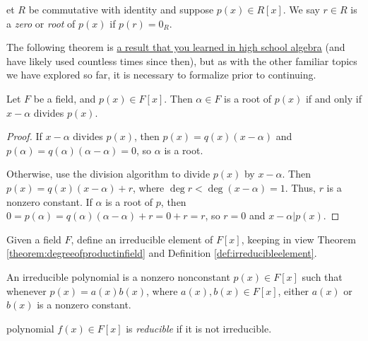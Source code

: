 \documentclass[english,course]{lecture}
\newenvironment{solution}[1][Solution]{\begin{trivlist}\pushQED{\qed}\item[\hskip \labelsep  \bfseries #1{}.\hspace{10pt}]}{\popQED\end{trivlist}}\renewcommand{\qedsymbol}{$\checkmark$}{\newenvironment{answer}{\renewcommand\qedsymbol{$\blacklozenge$}\begin{proof}[Answer]}{\end{proof}}}\newenvironment{answer}[1][Answer]{\begin{trivlist}\pushQED{\qed}\item[\hskip \labelsep  \bfseries #1{}.\hspace{10pt}]}{\popQED\end{trivlist}}\renewcommand{\qedsymbol}{$\lozenge$}
\theoremstyle{plain}
\newenvironment{question}[1]
  {\renewcommand\theinnerquestion{#1}\innerquestion}
  {\endinnerquestion}
\newenvironment{definition}[1]
  {\renewcommand\theinnerdefinition{#1}\innerdefinition}
  {\endinnerdefinition}
\def\presnotes{}
\begin{document}
\begin{definition}
	Let $R$ be commutative with identity and suppose $p(x) \in R[x]$.
	We say $r\in R$ is a \emph{zero} or \emph{root} of $p(x)$ if $p(r) = 0_R$.
\end{definition}


The following theorem is \href{http://www.corestandards.org/Math/Content/HSA/APR/B/2/}{a result that you learned in high school algebra} (and have likely used countless times since then), but as with the other familiar topics we have explored so far, it is necessary to formalize prior to continuing.

\begin{theorem}
	Let $F$ be a field, and $p(x)\in F[x]$.
	Then $\alpha\in F$ is a root of $p(x)$ if and only if $x-\alpha$ divides $p(x)$.	
\end{theorem}

\begin{proof}
	If $x-\alpha$ divides $p(x)$, then $p(x) = q(x) (x-\alpha)$ and $p(\alpha)  = q(\alpha) (\alpha - \alpha) = 0$, so $\alpha$ is a root.
	
	Otherwise, use the division algorithm to divide $p(x)$ by $x-\alpha$.
	Then $p(x) = q(x)(x-\alpha) + r$, where $\deg r < \deg (x-\alpha) = 1$.
	Thus, $r$ is a nonzero constant.
	If $\alpha$ is a root of $p$, then $0 = p(\alpha) = q(\alpha) (\alpha - \alpha) + r = 0 + r = r$, so $r=0$ and $x-\alpha | p(x)$.	
\end{proof}

\presnotes



\begin{exer}
	Given a field $F$, define an irreducible element of $F[x]$, keeping in view Theorem \ref{theorem:degreeofproductinfield} and Definition \ref{def:irreducibleelement}.
\end{exer}

\begin{solution}
	An irreducible polynomial is a nonzero nonconstant $p(x)\in F[x]$ such that whenever $p(x) = a(x) b(x)$, where $a(x), b(x) \in F[x]$, either $a(x)$ or $b(x)$ is a nonzero constant.
\end{solution}

\presnotes

\begin{definition}
	A polynomial $f(x)\in F[x]$ is \emph{reducible} if it is not irreducible.
\end{definition}
\end{document}

